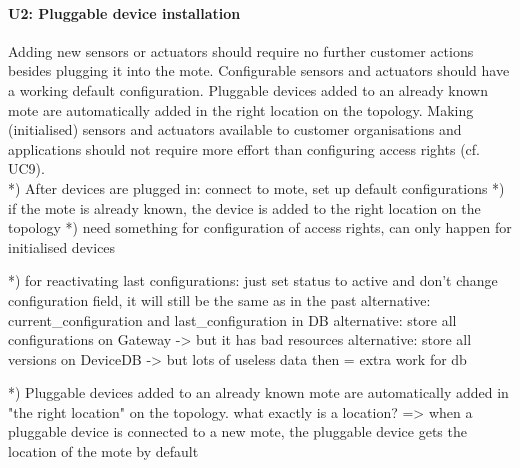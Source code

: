     \paragraph{U2: Pluggable device installation}
        Adding new sensors or actuators should require no further customer
        actions besides plugging it into the mote. Configurable sensors and
        actuators should have a working default configuration.
        Pluggable devices added to an already known mote are automatically
        added in the right location on the topology.
        Making (initialised) sensors and actuators available to customer
        organisations and applications should not require more effort than
        configuring access rights (cf. UC9). \\
        *) After devices are plugged in: connect to mote, set up default configurations
        *) if the mote is already known, the device is added to the right location on the topology
        *) need something for configuration of access rights, can only happen for initialised devices

        *) for reactivating last configurations: just set status to active and don't change configuration field, it will still be the same as in the past
            alternative: current\_configuration and last\_configuration in DB
            alternative: store all configurations on Gateway -> but it has bad resources
            alternative: store all versions on DeviceDB -> but lots of useless data then = extra work for db

        *) Pluggable devices added to an already known mote are automatically added in "the right location" on the topology.
            what exactly is a location?
            => when a pluggable device is connected to a new mote, the pluggable device gets the location of the mote by default

